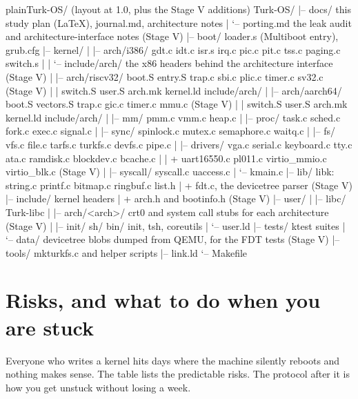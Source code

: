 \documentclass[11pt,a4paper]{article}
\begin{document}
\begin{lst}{plain}{Turk-OS/ (layout at 1.0, plus the Stage V additions)}
Turk-OS/
|-- docs/                  this study plan (LaTeX), journal.md, architecture notes
|   `-- porting.md         the leak audit and architecture-interface notes        (Stage V)
|-- boot/                  loader.s (Multiboot entry), grub.cfg
|-- kernel/
|   |-- arch/i386/         gdt.c idt.c isr.s irq.c pic.c pit.c tss.c paging.c switch.s
|   |   `-- include/arch/  the x86 headers behind the architecture interface      (Stage V)
|   |-- arch/riscv32/      boot.S entry.S trap.c sbi.c plic.c timer.c sv32.c      (Stage V)
|   |                      switch.S user.S arch.mk kernel.ld include/arch/
|   |-- arch/aarch64/      boot.S vectors.S trap.c gic.c timer.c mmu.c            (Stage V)
|   |                      switch.S user.S arch.mk kernel.ld include/arch/
|   |-- mm/                pmm.c vmm.c heap.c
|   |-- proc/              task.c sched.c fork.c exec.c signal.c
|   |-- sync/              spinlock.c mutex.c semaphore.c waitq.c
|   |-- fs/                vfs.c file.c tarfs.c turkfs.c devfs.c pipe.c
|   |-- drivers/           vga.c serial.c keyboard.c tty.c ata.c ramdisk.c blockdev.c bcache.c
|   |                      + uart16550.c pl011.c virtio_mmio.c virtio_blk.c       (Stage V)
|   |-- syscall/           syscall.c uaccess.c
|   `-- kmain.c
|-- lib/                   libk: string.c printf.c bitmap.c ringbuf.c list.h
|                          + fdt.c, the devicetree parser                         (Stage V)
|-- include/               kernel headers
|                          + arch.h and bootinfo.h                                (Stage V)
|-- user/
|   |-- libc/              Turk-libc
|   |-- arch/<arch>/       crt0 and system call stubs for each architecture       (Stage V)
|   |-- init/ sh/ bin/     init, tsh, coreutils
|   `-- user.ld
|-- tests/                 ktest suites
|   `-- data/              devicetree blobs dumped from QEMU, for the FDT tests   (Stage V)
|-- tools/                 mkturkfs.c and helper scripts
|-- link.ld
`-- Makefile
\end{lst}

\section{Risks, and what to do when you are stuck}

Everyone who writes a kernel hits days where the machine silently reboots and nothing makes sense. The table lists
the predictable risks. The protocol after it is how you get unstuck without losing a week.
\end{document}
